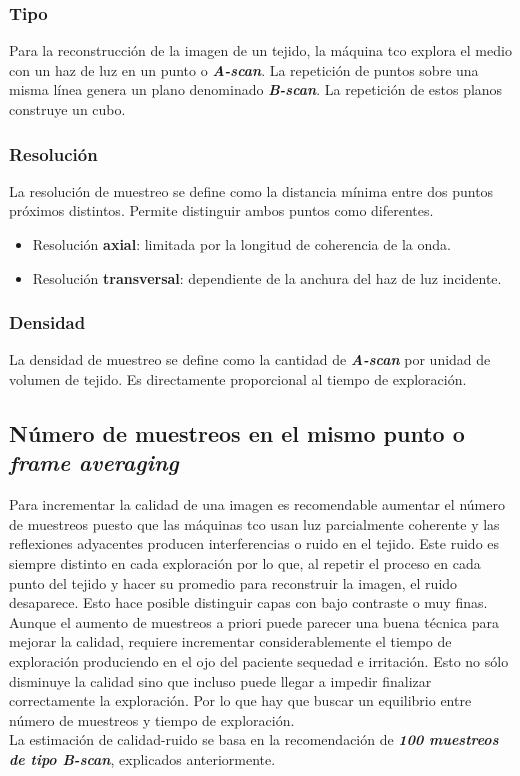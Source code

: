 \subsubsection{Tipo}
Para la reconstrucción de la imagen de un tejido, la máquina
\gls{tco} explora el medio con un haz de luz en un punto o
\emph{\textbf{A-scan}}. La repetición de puntos sobre una misma línea
genera un plano denominado \emph{\textbf{B-scan}}. La repetición de
estos planos construye un cubo.
\subsubsection{Resolución}
La resolución de muestreo se define como la distancia mínima entre dos
puntos próximos distintos. Permite distinguir ambos puntos como
diferentes.
\begin{itemize}
\item Resolución \textbf{axial}: limitada por la longitud de
  coherencia de la onda.
\item Resolución \textbf{transversal}: dependiente de la anchura del
  haz de luz incidente.
\end{itemize}
\subsubsection{Densidad}
La densidad de muestreo se define como la cantidad de
\emph{\textbf{A-scan}} por unidad de volumen de tejido. Es
directamente proporcional al tiempo de exploración.

\subsection{Número de muestreos en el mismo punto o \emph{frame
    averaging}}
Para incrementar la calidad de una imagen es recomendable aumentar el
número de muestreos puesto que las máquinas \gls{tco} usan luz
parcialmente coherente y las reflexiones
adyacentes producen interferencias o ruido en el tejido. Este ruido es
siempre distinto en cada exploración por lo que, al repetir el proceso
en cada punto del tejido y hacer su promedio para reconstruir la imagen, el
ruido desaparece. Esto hace posible distinguir capas con bajo contraste o
muy finas.\\
Aunque el aumento de muestreos a priori puede parecer una buena
técnica para mejorar la calidad, requiere incrementar
considerablemente el tiempo de exploración produciendo en el ojo del
paciente sequedad e irritación. Esto no sólo disminuye la calidad sino
que incluso puede llegar a impedir finalizar correctamente la
exploración. Por lo que hay que buscar un equilibrio entre número de
muestreos y tiempo de exploración.\\
La estimación de calidad-ruido se basa en la recomendación de
\emph{\textbf{100 muestreos de tipo B-scan}}, explicados anteriormente.

